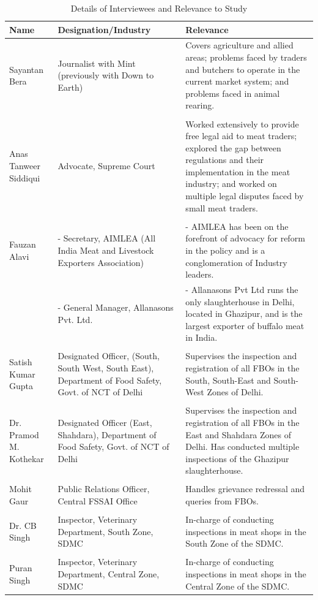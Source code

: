 \documentclass[a4paper, 12pt]{article}
\begin{document}
 \begin{longtable}{>{\raggedright}p{2cm}>{\raggedright}p{5cm}>{\raggedright\arraybackslash}p{7.5cm}}
\caption{Details of Interviewees and Relevance to Study} \\
\toprule
Name & Designation/Industry & Relevance \\
\midrule
\endfirsthead
\endhead
\midrule
\endlastfoot
   
    Sayantan Bera & Journalist with Mint (previously with Down to Earth) & Covers agriculture and allied areas; problems faced by traders and butchers to operate in the current market system; and problems faced in animal rearing. \\
& & \\
    Anas Tanweer Siddiqui & Advocate, Supreme Court  & Worked extensively to provide free legal aid to meat traders; explored the gap between regulations and their implementation in the meat industry; and worked on multiple legal disputes faced by small meat traders. \\
& & \\
    Fauzan Alavi & - Secretary, AIMLEA (All India Meat and Livestock Exporters Association) & - AIMLEA has been on the forefront of advocacy for reform in the policy and is a conglomeration of Industry leaders. \\
    \multicolumn{1}{r}{} & - General Manager, Allanasons Pvt. Ltd. & - Allanasons Pvt Ltd runs the only slaughterhouse in Delhi, located in Ghazipur, and is the largest exporter of buffalo meat in India. \\
& & \\
    Satish Kumar Gupta & Designated Officer, (South, South West, South East), Department of Food Safety, Govt. of NCT of Delhi & Supervises the inspection and registration of all FBOs in the South, South-East and South-West Zones of Delhi. \\
& & \\
    Dr. Pramod M. Kothekar & Designated Officer (East, Shahdara), Department of Food Safety, Govt. of NCT of Delhi & Supervises the inspection and registration of all FBOs in the East and Shahdara Zones of Delhi. Has conducted multiple inspections of the Ghazipur slaughterhouse. \\
& & \\
    Mohit Gaur & Public Relations Officer, Central FSSAI Office & Handles grievance redressal and queries from FBOs.  \\
   & & \\
    Dr. CB Singh & Inspector, Veterinary Department, South Zone, SDMC & In-charge of conducting inspections in meat shops in the South Zone of the SDMC. \\
& & \\
    Puran Singh & Inspector, Veterinary Department, Central Zone, SDMC & In-charge of conducting inspections in meat shops in the Central Zone of the SDMC. \\
    \end{longtable}%
\end{document}
